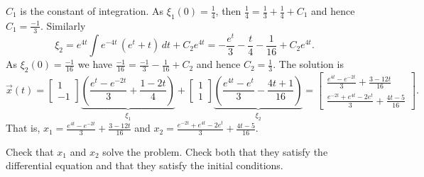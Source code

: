 \documentclass{ximera}
\begin{document}
\begin{exampleSol}
\begin{equation*}
    \end{equation*}
    $C_1$ is the constant of integration. As $\xi_1(0) = \frac{1}{4}$, then $\frac{1}{4}= \frac{1}{3} + \frac{1}{4} + C_1$ and hence $C_1 = \frac{-1}{3}$. Similarly
    \begin{equation*}
        \xi_2 = e^{4t}\int e^{-4t} \, (e^t+ t) \, dt + C_2 e^{4t} = -\frac{e^t}{3}-\frac{t}{4}-\frac{1}{16} + C_2 e^{4t} .
    \end{equation*}
    As $\xi_2(0) = \frac{-1}{16}$ we have $\frac{-1}{16}= \frac{-1}{3} -\frac{1}{16} + C_2$ and hence $C_2 = \frac{1}{3}$. The solution is
    \begin{equation*}
        \vec{x}(t)=
        \begin{bmatrix}
            1 \\
            -1
        \end{bmatrix}
        \underbrace{
            \left( \frac{e^t-e^{-2t}}{3}+\frac{1-2t}{4} \right)
        }%
        _{\xi_1} +
        \begin{bmatrix}
            1 \\
            1
        \end{bmatrix}
        \underbrace{
            \left( \frac{e^{4t}-e^t}{3}-\frac{4t+1}{16} \right)
        }%
        _{\xi_2} =
        \begin{bmatrix}
            \frac{e^{4t}-e^{-2t}}{3}+\frac{3-12t}{16} \\
            \frac{e^{-2t}+e^{4t}-2e^t}{3}+\frac{4t-5}{16}
        \end{bmatrix} .
    \end{equation*}
    That is, $x_1 = \frac{e^{4t}-e^{-2t}}{3}+\frac{3-12t}{16}$ and $x_2 = \frac{e^{-2t}+e^{4t}-2e^t}{3}+\frac{4t-5}{16}$.
\end{exampleSol}

\begin{exercise}
    Check that $x_1$ and $x_2$ solve the problem.  Check both that they satisfy the differential equation and that they satisfy the initial conditions.
\end{exercise}

\end{document}
